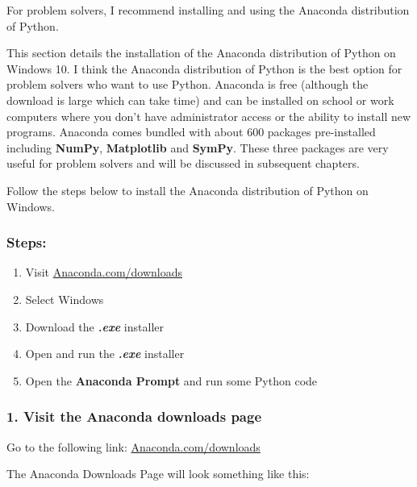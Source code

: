 \documentclass{book}
\begin{document}
    
        For problem solvers, I recommend installing and using the Anaconda
distribution of Python.
    




    
        This section details the installation of the Anaconda distribution of
Python on Windows 10. I think the Anaconda distribution of Python is the
best option for problem solvers who want to use Python. Anaconda is free
(although the download is large which can take time) and can be
installed on school or work computers where you don't have administrator
access or the ability to install new programs. Anaconda comes bundled
with about 600 packages pre-installed including \textbf{NumPy},
\textbf{Matplotlib} and \textbf{SymPy}. These three packages are very
useful for problem solvers and will be discussed in subsequent chapters.

Follow the steps below to install the Anaconda distribution of Python on
Windows.

\hypertarget{steps}{%
\subsubsection{Steps:}\label{steps}}

\begin{enumerate}
\def\labelenumi{\arabic{enumi}.}
\item
  Visit
  \href{https://www.anaconda.com/download/}{Anaconda.com/downloads}
\item
  Select Windows
\item
  Download the \textbf{\emph{.exe}} installer
\item
  Open and run the \textbf{\emph{.exe}} installer
\item
  Open the \textbf{Anaconda Prompt} and run some Python code
\end{enumerate}
    




    
        \hypertarget{visit-the-anaconda-downloads-page}{%
\subsubsection{1. Visit the Anaconda downloads
page}\label{visit-the-anaconda-downloads-page}}

Go to the following link:
\href{https://www.anaconda.com/download/}{Anaconda.com/downloads}

The Anaconda Downloads Page will look something like this:
\end{document}
